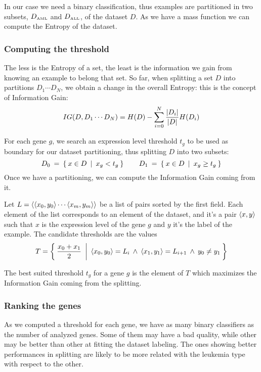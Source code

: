         In our case we need a binary classification, thus examples are
        partitioned in two subsets, $D_{\tiny{\mbox{AML}}}$ and
        $D_{\tiny{\mbox{ALL}}}$, of the dataset $D$. As we have a mass function
        we can compute the Entropy of the dataset.

    \subsubsection{ Computing the threshold }

        The less is the Entropy of a set, the least is the information we
        gain from knowing an example to belong that set. So far, when
        splitting a set $D$ into partitions $D_1 \cdots D_N$, we obtain a
        change in the overall Entropy: this is the concept of Information
        Gain:
        \[
        IG(D, D_1 \cdots D_N) =
            H(D) - \sum_{i = 0}^N \frac{ \left|{D_i}\right| }{ \left|{D}\right| } H(D_i)
        \]

        For each gene $g$, we search an expression level threshold $t_g$
        to be used as boundary for our dataset partitioning, thus
        splitting $D$ into two subsets:
        \[
        D_0 \:=\: \Set{ x \in D \:|\: x_g < t_g }
        \qquad
        D_1 \:=\: \Set{ x \in D \:|\: x_g \geq t_g }
        \]
        Once we have a partitioning, we can compute the Information Gain
        coming from it.

        Let $L = \left \langle {\ensuremath{\left \langle {x_0, y_0} \right \rangle } \cdots \ensuremath{\left \langle {x_m, y_m} \right \rangle }} \right \rangle $ be a
        list of pairs sorted by the first field. Each element of the list
        corresponds to an element of the dataset, and it's a pair
        $\left \langle {x,y} \right \rangle $ such that $x$ is the expression level of the gene
        $g$ and $y$ it's the label of the example. The candidate
        thresholds are the values
        \[
        T = \Set{ \frac{x_0 + x_1}{2} \:|\:
                  \ensuremath{\left \langle {x_0, y_0} \right \rangle } = L_i \:\land\:
                  \ensuremath{\left \langle {x_1, y_1} \right \rangle } = L_{i + 1} \:\land\:
                  y_0 \neq y_1 }
        \]

        The best suited threshold $t_g$ for a gene $g$ is the element of
        $T$ which maximizes the Information Gain coming from the splitting.

    \subsubsection{ Ranking the genes }

        As we computed a threshold for each gene, we have as many binary
        classifiers as the number of analyzed genes. Some of them may
        have a bad quality, while other may be better than other at
        fitting the dataset labeling. The ones showing better performances
        in splitting are likely to be more related with the leukemia type
        with respect to the other.

